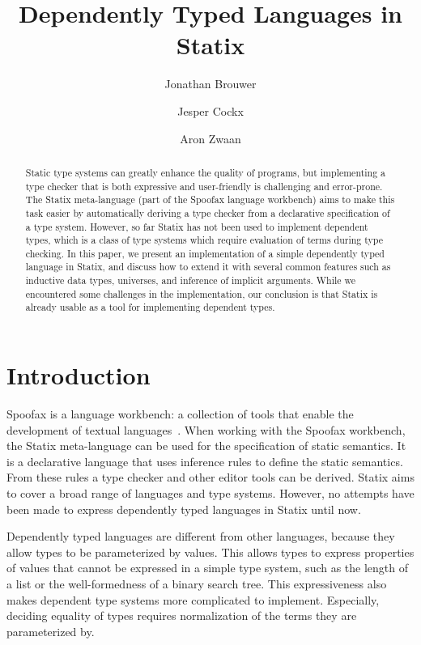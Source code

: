 \documentclass[a4paper,UKenglish,cleveref, autoref, thm-restate]{oasics-v2021}
\title{Dependently Typed Languages in Statix}
\author{Jonathan Brouwer}{Delft University of Technology, The Netherlands \and \url{http://jonathanb.nl}}{j.t.brouwer@student.tudelft.nl}{https://orcid.org/0000-0002-2469-548X}{}
\author{Jesper Cockx}{Delft University of Technology, The Netherlands \and \url{http://jesper.sikanda.be}}{j.g.h.cockx@tudelft.nl}{https://orcid.org/0000-0003-3862-4073}{}
\author{Aron Zwaan}{Delft University of Technology, The Netherlands \and \url{http://aronzwaan.github.io}}{a.s.zwaan@tudelft.nl}{https://orcid.org/0000-0002-1818-4245}{}
\begin{document}
\maketitle

\begin{abstract}
Static type systems can greatly enhance the quality of programs, but implementing a type checker that is both expressive and user-friendly is challenging and error-prone. The Statix meta-language (part of the Spoofax language workbench) aims to make this task easier by automatically deriving a type checker from a declarative specification of a type system. However, so far Statix has not been used to implement dependent types, which is a class of type systems which require evaluation of terms during type checking. In this paper, we present an implementation of a simple dependently typed language in Statix, and discuss how to extend it with several common features such as inductive data types, universes, and inference of implicit arguments. While we encountered some challenges in the implementation, our conclusion is that Statix is already usable as a tool for implementing dependent types.
\end{abstract}

\section{Introduction}

Spoofax is a language workbench: \label{key}a collection of tools that enable the development of textual languages~\cite{spoofax}. When working with the Spoofax workbench, the Statix meta-language can be used for the specification of static semantics. It is a declarative language that uses inference rules to define the static semantics. From these rules a type checker and other editor tools can be derived. Statix aims to cover a broad range of languages and type systems. However, no attempts have been made to express dependently typed languages in Statix until now. 

Dependently typed languages are different from other languages, because they allow types to be parameterized by values. This allows types to express properties of values that cannot be expressed in a simple type system, such as the length of a list or the well-formedness of a binary search tree. This expressiveness also makes dependent type systems more complicated to implement. Especially, deciding equality of types requires normalization of the terms they are parameterized by. 
\end{document}
